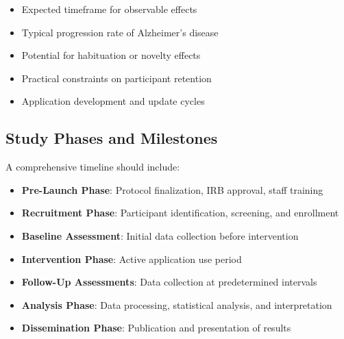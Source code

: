 \begin{itemize}
    \item Expected timeframe for observable effects
    \item Typical progression rate of Alzheimer's disease
    \item Potential for habituation or novelty effects
    \item Practical constraints on participant retention
    \item Application development and update cycles
\end{itemize}

\subsection{Study Phases and Milestones}
A comprehensive timeline should include:

\begin{itemize}
    \item \textbf{Pre-Launch Phase}: Protocol finalization, IRB approval, staff training
    \item \textbf{Recruitment Phase}: Participant identification, screening, and enrollment
    \item \textbf{Baseline Assessment}: Initial data collection before intervention
    \item \textbf{Intervention Phase}: Active application use period
    \item \textbf{Follow-Up Assessments}: Data collection at predetermined intervals
    \item \textbf{Analysis Phase}: Data processing, statistical analysis, and interpretation
    \item \textbf{Dissemination Phase}: Publication and presentation of results
\end{itemize}